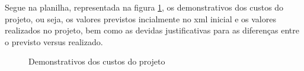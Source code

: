 Segue na planilha, representada na figura \ref{fig::demos}, os demonstrativos
dos custos do projeto, ou seja, os valores previstos incialmente no xml inicial e os valores realizados no
projeto, bem como as devidas justificativas para as diferenças entre o previsto versus realizado.

\begin{figure}[H]
\caption{Demonstrativos dos custos do projeto}
\label{fig::demos}
\end{figure}
